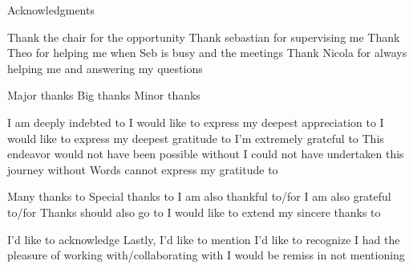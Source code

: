 \thispagestyle{empty}

\vspace*{20mm}

\begin{center}
    { Acknowledgments}
\end{center}

\vspace{10mm}

Thank the chair for the opportunity
Thank sebastian for supervising me
Thank Theo for helping me when Seb is busy and the meetings
Thank Nicola for always helping me and answering my questions

Major thanks 	Big thanks 	Minor thanks

    I am deeply indebted to
    I would like to express my deepest appreciation to
    I would like to express my deepest gratitude to
    I’m extremely grateful to
    This endeavor would not have been possible without
    I could not have undertaken this journey without
    Words cannot express my gratitude to

	

    Many thanks to
    Special thanks to
    I am also thankful to/for
    I am also grateful to/for
    Thanks should also go to
    I would like to extend my sincere thanks to

	

    I’d like to acknowledge
    Lastly, I’d like to mention
    I’d like to recognize
    I had the pleasure of working with/collaborating with
    I would be remiss in not mentioning


\cleardoublepage{}
